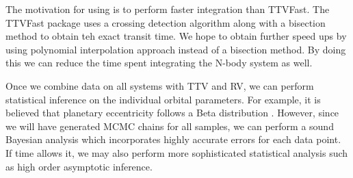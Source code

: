The motivation for using \reb is to perform faster integration than TTVFast.
The TTVFast package uses a crossing detection algorithm along with a bisection method to obtain teh exact transit time.
We hope to obtain further speed ups by using polynomial interpolation approach instead of a bisection method.
By doing this we can reduce the time spent integrating the N-body system as well.

Once we combine data on all systems with TTV and RV, we can perform statistical inference on the individual orbital parameters.
For example, it is believed that planetary eccentricity follows a Beta distribution \cite{kipping2013parametrizing}.
However, since we will have generated MCMC chains for all samples, we can perform a sound Bayesian analysis which incorporates highly accurate errors for each data point.
If time allows it, we may also perform more sophisticated statistical analysis such as high order asymptotic inference.